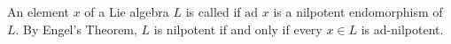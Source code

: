 An element $x$ of a Lie algebra $L$ is called  if $\text{ad } x$ is a nilpotent endomorphism of $L$. By Engel's Theorem, $L$ is nilpotent if and only if every $x \in L$ is ad-nilpotent.
